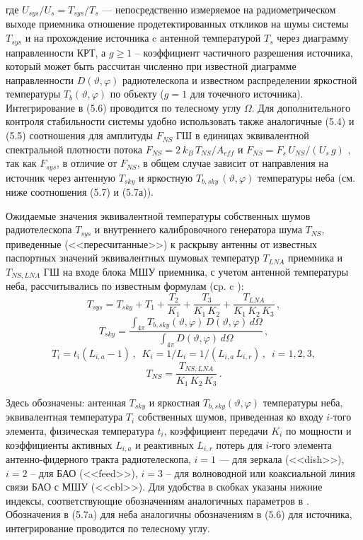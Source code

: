 \noindent
где $ U_{sys} / U_s = T_{sys} / T_s$ --- непосредственно измеряемое на
радиометрическом выходе приемника отношение продетектированных
откликов на шумы системы $T_{sys}$ и на прохождение источника c
антенной температурой $T_s$ через диаграмму направленности КРТ,
а $g \ge 1$ -- коэффициент частичного разрешения источника,
который может быть рассчитан численно при известной диаграмме
направленности $D(\vartheta, \varphi)$ радиотелескопа и
известном распределении яркостной температуры
$T_b (\vartheta, \varphi)$
по объекту ($g = 1$ для точечного источника).
Интегрирование в (5.6) проводится по телесному углу $\Omega$.
Для дополнительного контроля
стабильности системы удобно использовать также
аналогичные (5.4) и (5.5) соотношения для амплитуды $F_{NS}$
ГШ в единицах эквивалентной спектральной плотности потока
$F_{NS} = 2\ k_B\, T_{NS} / A_{eff}$ и
$F_{NS} = F_s\, U_{NS} / (U_s\, g)$  \cite{Kovalev_1999},
так как $F_{sys}$, в отличие от $F_{NS}$, в общем случае зависит от
направления на источник через антенную $T_{sky}$ и яркостную
$T_{b,sky}\, (\vartheta, \varphi)$ температуры неба (см. ниже
соотношения (5.7) и (5.7а)).

Ожидаемые значения эквивалентной температуры собственных шумов радиотелескопа
$T_{sys}$ и внутреннего калибровочного генератора шума $T_{NS}$,
приведенные (<<пересчитанные>>) к раскрыву антенны от известных паспортных
значений эквивалентных шумовых температур $T_{LNA}$ приемника и $T_{NS,LNA}$ ГШ
на входе блока МШУ приемника, с учетом антенной температуры
неба, рассчитывались по известным формулам (сp. c \cite{RAUH}):
$$
T_{sys} = T_{sky} + T_1 + \frac{T_2}{K_1} +
\frac{T_3}{K_1\, K_2} + \frac{T_{LNA}}{K_1\, K_2\, K_3}\,,
$$
$$
T_{sky} = \frac{\int_{4 \pi}^{}{T_{b,sky} (\vartheta, \varphi)\, D(\vartheta, \varphi)\, d\Omega}}
{\int_{4 \pi}^{}{D(\vartheta, \varphi)\, d \Omega}} \,,
$$
$$
T_i = t_i (L_{i,a} -1)\, , \,\,\,
K_i = 1/ L_i = 1 / (L_{i,a}\, L_{i,r})\, , \,\,\, i = 1, 2, 3,
$$
$$
T_{NS} = \frac{T_{NS,LNA}}{K_1\, K_2\, K_3}\,.
$$

\noindent
Здесь обозначены: антенная $T_{sky}$ и яркостная  $T_{b,sky} (\vartheta, \varphi)$
температуры неба, эквивалентная температура $T_i$ собственных шумов,
приведенная ко входу $i$-того элемента,
физическая температура $t_i$, коэффициент передачи $K_i$ по мощности
и коэффициенты активных $L_{i,a}$ и реактивных $L_{i,r}$ потерь
для $i$-того элемента антенно-фидерного тракта радиотелескопа,
$i = 1$ --- для зеркала (<<dish>>), $i = 2$ -- для БАО (<<feed>>),
$i = 3$ -- для волноводной или коаксиальной линия связи БАО с МШУ (<<cbl>>).
Для удобства в скобках указаны нижние индексы, соответствующие обозначениям
аналогичных параметров в \cite{RAUH}.
Обозначения в (5.7a) для неба аналогичны обозначениям в (5.6) для источника,
интегрирование проводится по телесному углу.

